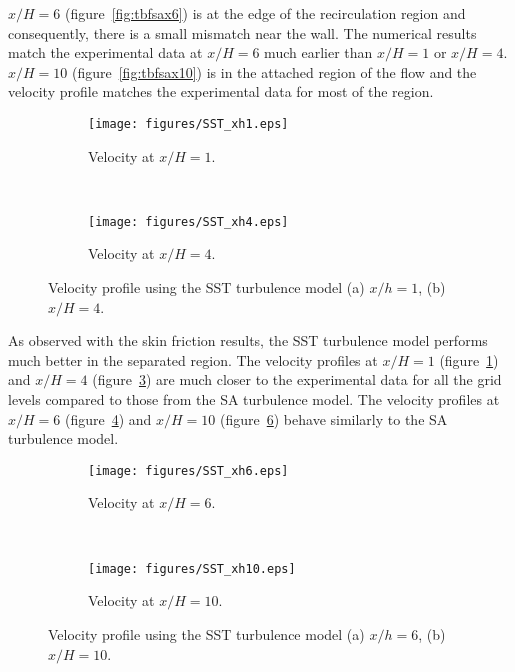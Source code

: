 $x/H=6$ (figure~\ref{fig:tbfsax6}) is at the edge of the recirculation region and consequently, there is a small mismatch near the wall. The numerical results match the experimental data at $x/H=6$ much earlier than $x/H=1$ or $x/H=4$. $x/H=10$ (figure~\ref{fig:tbfsax10}) is in the attached region of the flow and the velocity profile matches the experimental data for most of the region.

\begin{figure}[h!]
    \centering
    \captionsetup{justification=centering}
    \begin{subfigure}[b]{0.48\textwidth}
    \captionsetup{justification=centering}
        \texttt{[image: figures/SST\_xh1.eps]}
        \caption{Velocity at $x/H=1$.}
        \label{fig:tbfsstx1}
    \end{subfigure}
    ~ %
    \begin{subfigure}[b]{0.48\textwidth}
    \centering
    \captionsetup{justification=centering}
        \texttt{[image: figures/SST\_xh4.eps]}
        \caption{Velocity at $x/H=4$.}
        \label{fig:tbfsstx4}
    \end{subfigure}
    \caption{Velocity profile using the SST turbulence model (a) $x/h=1$, (b) $x/H=4$.}
\end{figure}
As observed with the skin friction results, the SST turbulence model performs much better in the separated region. The velocity profiles at $x/H=1$ (figure~\ref{fig:tbfsstx1}) and $x/H=4$ (figure~\ref{fig:tbfsstx4}) are much closer to the experimental data for all the grid levels compared to those from the SA turbulence model. The velocity profiles at $x/H=6$ (figure~\ref{fig:tbfsstx6}) and $x/H=10$ (figure~\ref{fig:tbfsstx10}) behave similarly to the SA turbulence model.
\begin{figure}[h!]
    \centering
    \captionsetup{justification=centering}
    \begin{subfigure}[b]{0.48\textwidth}
    \captionsetup{justification=centering}
        \texttt{[image: figures/SST\_xh6.eps]}
        \caption{Velocity at $x/H=6$.}
        \label{fig:tbfsstx6}
    \end{subfigure}
    ~ %
    \begin{subfigure}[b]{0.48\textwidth}
    \centering
    \captionsetup{justification=centering}
        \texttt{[image: figures/SST\_xh10.eps]}
        \caption{Velocity at $x/H=10$.}
        \label{fig:tbfsstx10}
    \end{subfigure}
    \caption{Velocity profile using the SST turbulence model (a) $x/h=6$, (b) $x/H=10$.}
\end{figure}

